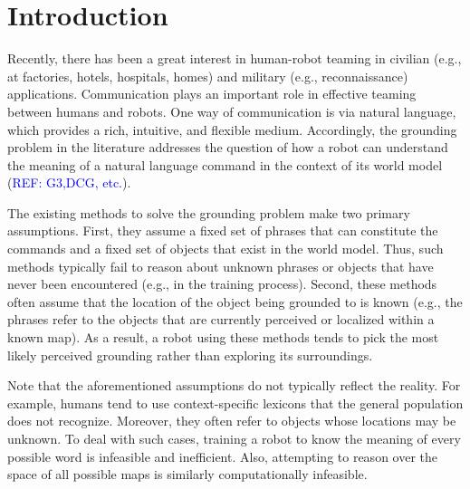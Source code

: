 \section{Introduction}
Recently, there has been a great interest in human-robot teaming in civilian (e.g., at factories, hotels, hospitals, homes) and military (e.g., reconnaissance) applications. Communication plays an important role in effective teaming between humans and robots. One way of communication is via natural language, which provides a rich, intuitive, and flexible medium. Accordingly, the grounding problem in the literature addresses the question of how a robot can understand the meaning of a natural language command in the context of its world model (\textcolor{blue}{REF: G3,DCG, etc.}). 

The existing methods to solve the grounding problem make two primary assumptions. First, they assume a fixed set of phrases that can constitute the commands and a fixed set of objects that exist in the world model. Thus, such methods typically fail to reason about unknown phrases or objects that have never been encountered (e.g., in the training process).
Second, these methods often assume that the location of the object being grounded to is known (e.g., the phrases refer to the objects that are currently perceived or localized within a known map).
As a result, a robot using these methods tends to pick the most likely perceived grounding rather than exploring its surroundings.

Note that the aforementioned assumptions do not typically reflect the reality. For example, humans tend to use context-specific lexicons that the general population does not recognize. Moreover, they often refer to objects whose locations may be unknown. To deal with such cases, training a robot to know the meaning of every possible word is infeasible and inefficient. Also, attempting to reason over the space of all possible maps is similarly computationally infeasible.

